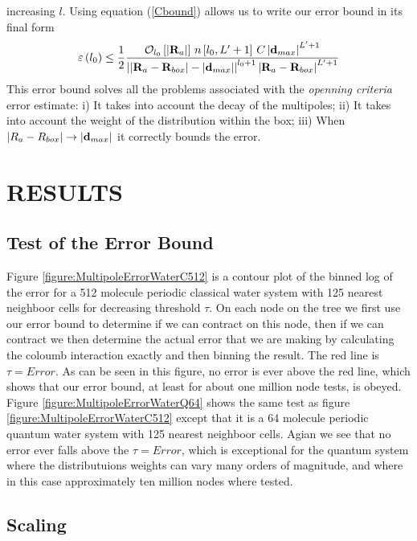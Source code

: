 \documentclass[prb,aps,nobibnotes,superbib,preprint]{revtex4}
\begin{document}
increasing $l$. Using equation (\ref{Cbound}) allows us to write our error bound in its final form
\begin{equation}
\varepsilon \left( l_{0}\right) \leq \frac{1}{2}\frac{{\cal O}_{l_{0}}\left[\left| 
\mathbf{R}_a\right| 
\right] \, n\left[ l_{0},L'+1\right] \, C \left| \mathbf{d}_{max}\right| ^{L'+1}}{
\left| \left| 
\mathbf{R}_a-\mathbf{R}_{box}\right| -\left| \mathbf{d}_{max}\right| \right| ^{l_{0}+1}\left| \mathbf{R}_a-
\mathbf{R}_{box}
\right| ^{L'+1}}
\end{equation}
This error bound solves all the problems associated with the {\it openning criteria} error estimate: 
i) It takes into account the decay of the multipoles; 
ii) It takes into account the weight of the distribution within the box;
iii) When $|R_a - R_{box}| \rightarrow |{\bf d}_{max}|$ it correctly bounds the error.

\section{RESULTS}

\subsection{Test of the Error Bound}

Figure \ref{figure:MultipoleErrorWaterC512} is a contour plot of the binned log of the error for a 
512 molecule periodic classical water system with 125 nearest neighboor cells for decreasing threshold $\tau$. 
On each node on the tree we first use our error bound to
determine if we can contract on this node, then if we can contract we then determine the actual error that we are
making by calculating the coloumb interaction exactly and then binning the result. 
The red  line is $\tau=Error$. As can be seen in this figure, no error is ever above the red line, which shows that our
error bound, at least for about one million node tests, is obeyed. 
Figure \ref{figure:MultipoleErrorWaterQ64} shows the same test as figure \ref{figure:MultipoleErrorWaterC512} except
that it is a 64 molecule periodic quantum water system with 125 nearest neighboor cells. Agian we see that no error
ever falls above the  $\tau=Error$, which is exceptional for the quantum system where the distributuions weights can vary
many orders of magnitude, and where in this case approximately ten million nodes where tested.  

\subsection{Scaling}
\end{document}
